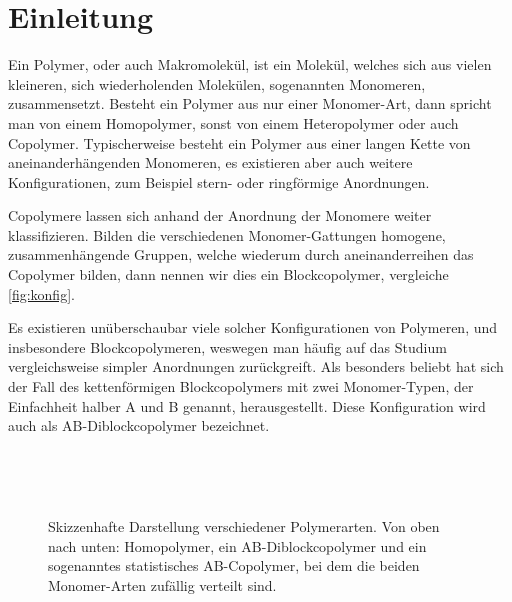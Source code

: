 
\chapter{Einleitung} %
\label{cha:einleitung}

Ein Polymer, oder auch Makromolekül, ist ein Molekül, welches sich aus vielen kleineren, sich wiederholenden Molekülen, sogenannten Monomeren, zusammensetzt.
Besteht ein Polymer aus nur einer Monomer-Art, dann spricht man von einem Homopolymer, sonst von einem Heteropolymer oder auch Copolymer.
Typischerweise besteht ein Polymer aus einer langen Kette von aneinanderhängenden Monomeren, es existieren aber auch weitere Konfigurationen, zum Beispiel stern- oder ringförmige Anordnungen.

Copolymere lassen sich anhand der Anordnung der Monomere weiter klassifizieren.
Bilden die verschiedenen Monomer-Gattungen homogene, zusammenhängende Gruppen, welche wiederum durch aneinanderreihen das Copolymer bilden, dann nennen wir dies ein Blockcopolymer, vergleiche \autoref{fig:konfig}.

Es existieren unüberschaubar viele solcher Konfigurationen von Polymeren, und insbesondere Blockcopolymeren, weswegen man häufig auf das Studium vergleichsweise simpler Anordnungen zurückgreift.
Als besonders beliebt hat sich der Fall des kettenförmigen Blockcopolymers mit zwei Monomer-Typen, der Einfachheit halber A und B genannt, herausgestellt.
Diese Konfiguration wird auch als AB-Diblockcopolymer bezeichnet.

\begin{figure}[tb]
    \centering
    \begin{subfigure}[b]{\textwidth}
        \centering
        
    \end{subfigure}
    \\[1em]
    \begin{subfigure}[b]{\textwidth}
        \centering
        
    \end{subfigure}
    \\[1em]
    \begin{subfigure}[b]{\textwidth}
        \centering
        
    \end{subfigure}
    \caption[Skizzenhafte Darstellung verschiedener Polymerarten]{%
        Skizzenhafte Darstellung verschiedener Polymerarten.
        Von oben nach unten: Homopolymer, ein AB-Diblockcopolymer und ein sogenanntes statistisches AB-Copolymer, bei dem die beiden Monomer-Arten zufällig verteilt sind.
    }
    \label{fig:konfig}
\end{figure}

